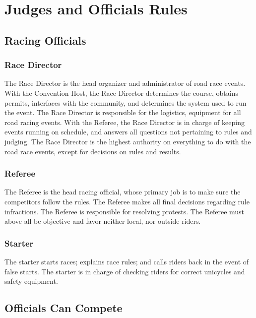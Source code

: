 \chapter{Judges and Officials Rules}

\section{Racing Officials}

\subsection{Race Director}

The Race Director is the head organizer and administrator of road race events.
With the Convention Host, the Race Director determines the course, obtains permits, interfaces with the community, and determines the system used to run the event.
The Race Director is responsible for the logistics, equipment for all road racing events.
With the Referee, the Race Director is in charge of keeping events running on schedule, and answers all questions not pertaining to rules and judging.
The Race Director is the highest authority on everything to do with the road race events, except for decisions on rules and results.

\subsection{Referee}

The Referee is the head racing official, whose primary job is to make sure the competitors follow the rules.
The Referee makes all final decisions regarding rule infractions.
The Referee is responsible for resolving protests.
The Referee must above all be objective and favor neither local, nor outside riders.

\subsection{Starter}

The starter starts races; explains race rules; and calls riders back in the event of false starts.
The starter is in charge of checking riders for correct unicycles and safety equipment.

\section{Officials Can Compete}

